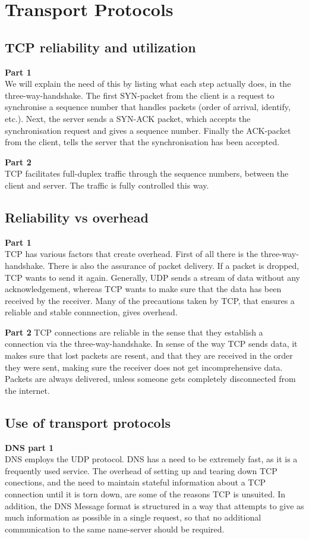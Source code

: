 \section{Transport Protocols}
\subsection{TCP reliability and utilization}
\textbf{Part 1} \\
We will explain the need of this by listing what each step actually does, in the
three-way-handshake. The first SYN-packet from the client is a request to
synchronise a sequence number that handles packets (order of arrival, identify,
etc.). Next, the server sends a SYN-ACK packet, which accepts the synchronisation
request and gives a sequence number. Finally the ACK-packet from the client,
tells the server that the synchronisation has been accepted.

\noindent \textbf{Part 2} \\
TCP facilitates full-duplex traffic through the sequence numbers, between the
client and server. The traffic is fully controlled this way.

\subsection{Reliability vs overhead}
\textbf{Part 1} \\
TCP has various factors that create overhead. First of all there is the
three-way-handshake. There is also the assurance of packet delivery. If a
packet is dropped, TCP wants to send it again. Generally, UDP sends a stream of
data without any acknowledgement, whereas TCP wants to make sure that the data
has been received by the receiver. Many of the precautions taken by TCP, that
ensures a reliable and stable connnection, gives overhead.

\noindent \textbf{Part 2}
TCP connections are reliable in the sense that they establish a connection via
the three-way-handshake. In sense of the way TCP sends data, it makes sure that
lost packets are resent, and that they are received in the order they were sent,
making sure the receiver does not get incomprehensive data. Packets are always
delivered, unless someone gets completely disconnected from the internet.

\subsection{Use of transport protocols}
\textbf{DNS part 1} \\
DNS employs the UDP protocol. DNS has a need to be extremely fast, as it is a frequently used service.
The overhead of setting up and tearing down TCP conections, and the need to maintain stateful information
about a TCP connection until it is torn down, are some of the reasons TCP is unsuited. In addition, the
DNS Message format is structured in a way that attempts to give as much information as possible in a single
request, so that no additional communication to the same name-server should be required.

